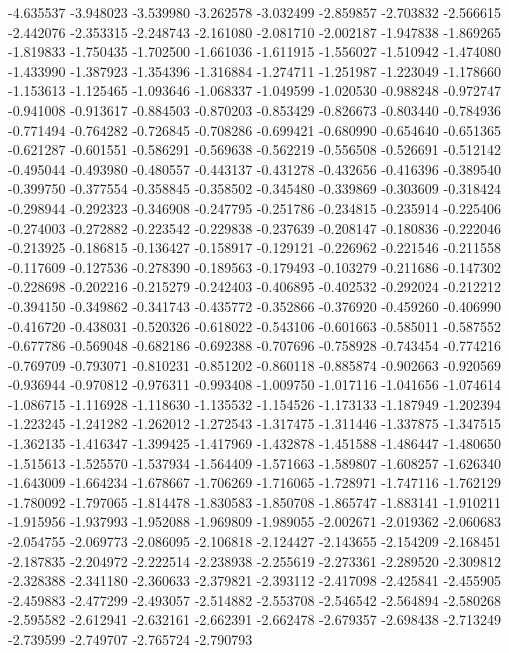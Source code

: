 -4.635537
-3.948023
-3.539980
-3.262578
-3.032499
-2.859857
-2.703832
-2.566615
-2.442076
-2.353315
-2.248743
-2.161080
-2.081710
-2.002187
-1.947838
-1.869265
-1.819833
-1.750435
-1.702500
-1.661036
-1.611915
-1.556027
-1.510942
-1.474080
-1.433990
-1.387923
-1.354396
-1.316884
-1.274711
-1.251987
-1.223049
-1.178660
-1.153613
-1.125465
-1.093646
-1.068337
-1.049599
-1.020530
-0.988248
-0.972747
-0.941008
-0.913617
-0.884503
-0.870203
-0.853429
-0.826673
-0.803440
-0.784936
-0.771494
-0.764282
-0.726845
-0.708286
-0.699421
-0.680990
-0.654640
-0.651365
-0.621287
-0.601551
-0.586291
-0.569638
-0.562219
-0.556508
-0.526691
-0.512142
-0.495044
-0.493980
-0.480557
-0.443137
-0.431278
-0.432656
-0.416396
-0.389540
-0.399750
-0.377554
-0.358845
-0.358502
-0.345480
-0.339869
-0.303609
-0.318424
-0.298944
-0.292323
-0.346908
-0.247795
-0.251786
-0.234815
-0.235914
-0.225406
-0.274003
-0.272882
-0.223542
-0.229838
-0.237639
-0.208147
-0.180836
-0.222046
-0.213925
-0.186815
-0.136427
-0.158917
-0.129121
-0.226962
-0.221546
-0.211558
-0.117609
-0.127536
-0.278390
-0.189563
-0.179493
-0.103279
-0.211686
-0.147302
-0.228698
-0.202216
-0.215279
-0.242403
-0.406895
-0.402532
-0.292024
-0.212212
-0.394150
-0.349862
-0.341743
-0.435772
-0.352866
-0.376920
-0.459260
-0.406990
-0.416720
-0.438031
-0.520326
-0.618022
-0.543106
-0.601663
-0.585011
-0.587552
-0.677786
-0.569048
-0.682186
-0.692388
-0.707696
-0.758928
-0.743454
-0.774216
-0.769709
-0.793071
-0.810231
-0.851202
-0.860118
-0.885874
-0.902663
-0.920569
-0.936944
-0.970812
-0.976311
-0.993408
-1.009750
-1.017116
-1.041656
-1.074614
-1.086715
-1.116928
-1.118630
-1.135532
-1.154526
-1.173133
-1.187949
-1.202394
-1.223245
-1.241282
-1.262012
-1.272543
-1.317475
-1.311446
-1.337875
-1.347515
-1.362135
-1.416347
-1.399425
-1.417969
-1.432878
-1.451588
-1.486447
-1.480650
-1.515613
-1.525570
-1.537934
-1.564409
-1.571663
-1.589807
-1.608257
-1.626340
-1.643009
-1.664234
-1.678667
-1.706269
-1.716065
-1.728971
-1.747116
-1.762129
-1.780092
-1.797065
-1.814478
-1.830583
-1.850708
-1.865747
-1.883141
-1.910211
-1.915956
-1.937993
-1.952088
-1.969809
-1.989055
-2.002671
-2.019362
-2.060683
-2.054755
-2.069773
-2.086095
-2.106818
-2.124427
-2.143655
-2.154209
-2.168451
-2.187835
-2.204972
-2.222514
-2.238938
-2.255619
-2.273361
-2.289520
-2.309812
-2.328388
-2.341180
-2.360633
-2.379821
-2.393112
-2.417098
-2.425841
-2.455905
-2.459883
-2.477299
-2.493057
-2.514882
-2.553708
-2.546542
-2.564894
-2.580268
-2.595582
-2.612941
-2.632161
-2.662391
-2.662478
-2.679357
-2.698438
-2.713249
-2.739599
-2.749707
-2.765724
-2.790793
